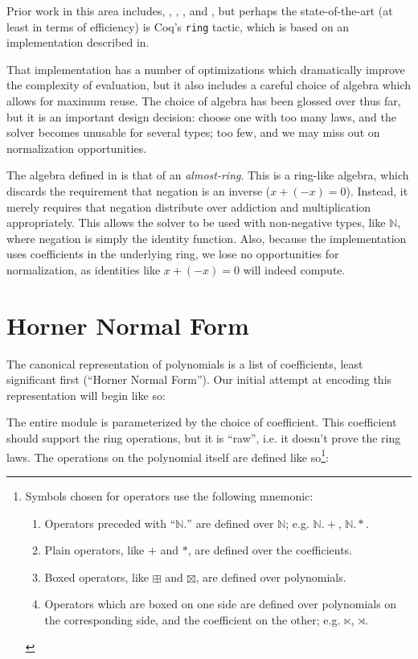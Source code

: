 \documentclass[draft, twocolumn]{article}
\begin{document}
Prior work in this area includes\cite{geuvers_automatically_2017},
\cite{meshveliani_dependent_2013}, \cite{zalakain_evidence-providing_2017},
\cite{cheng_functional_2018}, and \cite{russino_polynomial_2017}, but perhaps
the state-of-the-art (at least in terms of efficiency) is Coq's \texttt{ring}
tactic\cite{the_coq_development_team_2018_1219885}, which is based on an
implementation described in\cite{hutchison_proving_2005}.

That implementation has a number of optimizations which dramatically improve the
complexity of evaluation, but it also includes a careful choice of algebra which
allows for maximum reuse. The choice of algebra has been glossed over thus far,
but it is an important design decision: choose one with too many laws, and the
solver becomes unusable for several types; too few, and we may miss out on
normalization opportunities.

The algebra defined in \cite{hutchison_proving_2005} is that of an
\emph{almost-ring}. This is a ring-like algebra, which discards the requirement
that negation is an inverse (\(x + (-x) = 0\)). Instead, it merely requires that
negation distribute over addiction and multiplication appropriately. This
allows the solver to be used with non-negative types, like \(\mathbb{N}\), where
negation is simply the identity function. Also, because the implementation uses
coefficients in the underlying ring, we lose no opportunities for normalization,
as identities like \(x + (-x) = 0\) will indeed compute.
\section{Horner Normal Form}
The canonical representation of polynomials is a list of coefficients, least
significant first (``Horner Normal Form''). Our initial attempt at encoding this
representation will begin like so:

The entire module is parameterized by the choice of coefficient. This
coefficient should support the ring operations, but it is ``raw'', i.e. it
doesn't prove the ring laws. The operations on the polynomial itself are defined
like so\footnote{
  Symbols chosen for operators use the following mnemonic:
  \begin{enumerate}
    \item Operators preceded with ``\(\mathbb{N}.\)'' are defined over
      \(\mathbb{N}\); e.g. \(\mathbb{N}.+\), \(\mathbb{N}.*\).
    \item Plain operators, like \(+\) and \(*\), are defined over the
      coefficients.
    \item Boxed operators, like \(\boxplus\) and \(\boxtimes\), are defined over
      polynomials.
    \item Operators which are boxed on one side are defined over polynomials on
      the corresponding side, and the coefficient on the other; e.g.
      \(\ltimes\), \(\rtimes\).
  \end{enumerate}
}:
\end{document}
